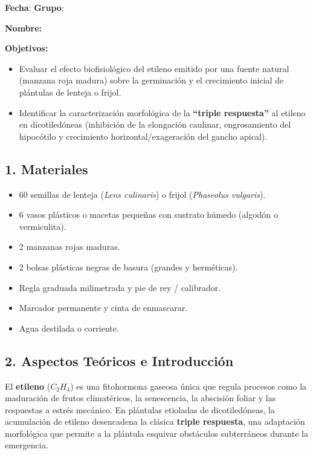 \documentclass[
  spanish,
  10pt,
  letterpaper,
  twocolumn]{article}
\title{\vspace{-1.5em}{\Huge \textbf{Práctica 7 -- Fisiología de las
Fitohormonas}}\vspace{-1.5em}}
\date{}
\providecommand{\tightlist}{%
  \setlength{\itemsep}{0pt}\setlength{\parskip}{0pt}}
\begin{document}
\maketitle


\textbf{Fecha}: \hrulefill \hfill \textbf{Grupo}: \hrulefill

\textbf{Nombre:} \hrulefill

\textbf{Objetivos:}

\begin{itemize}
\tightlist
\item
  Evaluar el efecto biofisiológico del etileno emitido por una fuente
  natural (manzana roja madura) sobre la germinación y el crecimiento
  inicial de plántulas de lenteja o frijol.
\item
  Identificar la caracterización morfológica de la \textbf{``triple
  respuesta''} al etileno en dicotiledóneas (inhibición de la elongación
  caulinar, engrosamiento del hipocótilo y crecimiento
  horizontal/exageración del gancho apical).
\end{itemize}

\subsection{1. Materiales}\label{materiales}

\begin{itemize}
\tightlist
\item
  60 semillas de lenteja (\emph{Lens culinaris}) o frijol
  (\emph{Phaseolus vulgaris}).
\item
  6 vasos plásticos o macetas pequeñas con sustrato húmedo (algodón o
  vermiculita).
\item
  2 manzanas rojas maduras.
\item
  2 bolsas plásticas negras de basura (grandes y herméticas).
\item
  Regla graduada milimetrada y pie de rey / calibrador.
\item
  Marcador permanente y cinta de enmascarar.
\item
  Agua destilada o corriente.
\end{itemize}

\subsection{2. Aspectos Teóricos e
Introducción}\label{aspectos-teuxf3ricos-e-introducciuxf3n}

El \textbf{etileno} (\(C_2H_4\)) es una fitohormona gaseosa única que
regula procesos como la maduración de frutos climatéricos, la
senescencia, la abscisión foliar y las respuestas a estrés mecánico. En
plántulas etioladas de dicotiledóneas, la acumulación de etileno
desencadena la clásica \textbf{triple respuesta}, una adaptación
morfológica que permite a la plántula esquivar obstáculos subterráneos
durante la emergencia.
\end{document}
